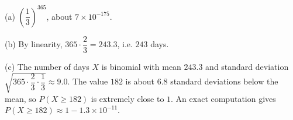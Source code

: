 (a) $\left(\dfrac13\right)^{365}$, about $7\times10^{-175}$.

(b) By linearity, $365\cdot\dfrac23=243.3$, i.e. $\boxed{243}$ days.

(c) The number of days $X$ is binomial with mean $243.3$ and standard deviation $\sqrt{365\cdot\dfrac23\cdot\dfrac13}\approx9.0$. The value $182$ is about $6.8$ standard deviations below the mean, so $P(X\ge182)$ is extremely close to $1$. An exact computation gives $P(X\ge182)\approx1-1.3\times10^{-11}$.
